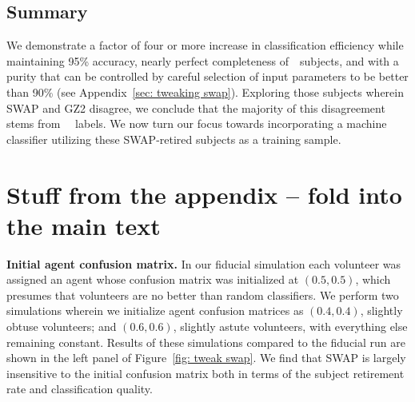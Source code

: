 \subsection{Summary}



We demonstrate a factor of four or more increase in 
classification efficiency while maintaining 95\% accuracy, nearly perfect 
completeness of~\feat~subjects, and with a purity that can be controlled by careful 
selection of input parameters to be better than 90\% (see Appendix~\ref{sec: tweaking swap}).
Exploring those subjects wherein SWAP and GZ2 disagree, we conclude that 
the majority of this disagreement stems from ~\raw~labels.
We now turn our focus towards incorporating a machine
classifier utilizing these SWAP-retired subjects as a training sample. 




\section{Stuff from the appendix -- fold into the main text}

\textbf{Initial agent confusion matrix.} 
In our fiducial simulation each volunteer was assigned an agent whose confusion matrix was
initialized at $(0.5, 0.5)$, which presumes that volunteers are no better than random classifiers.  
We perform two simulations wherein we initialize agent confusion matrices as $(0.4, 0.4)$, 
slightly obtuse volunteers; and $(0.6, 0.6)$, slightly astute volunteers, with everything else remaining constant.  
Results of these simulations compared to the fiducial run are shown in the left panel of
Figure~\ref{fig: tweak swap}. We find that SWAP is largely insensitive to the 
initial confusion matrix  both in terms of the subject retirement rate and classification quality.  



